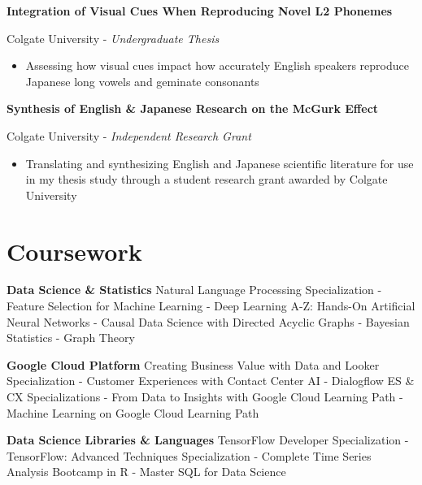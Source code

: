 \documentclass[a4paper,9pt]{extarticle}
\begin{document}
\noindent\textbf{Integration of Visual Cues When Reproducing Novel L2 Phonemes}

Colgate University - \textit{Undergraduate Thesis}
\begin{itemize}
\item Assessing how visual cues impact how accurately English speakers reproduce Japanese long vowels and geminate consonants
\end{itemize}

\noindent\textbf{Synthesis of English \& Japanese Research on the McGurk Effect}

Colgate University - \textit{Independent Research Grant}
\begin{itemize}
\item Translating and synthesizing English and Japanese scientific literature for use in my thesis study through a student research grant awarded by Colgate University
\end{itemize}

\section*{Coursework}
\noindent\textbf{Data Science \& Statistics}
Natural Language Processing Specialization - Feature Selection for Machine Learning - Deep Learning A-Z: Hands-On Artificial Neural Networks - Causal Data Science with Directed Acyclic Graphs - Bayesian Statistics - Graph Theory

\noindent\textbf{Google Cloud Platform}
Creating Business Value with Data and Looker Specialization - Customer Experiences with Contact Center AI - Dialogflow ES \& CX Specializations - From Data to Insights with Google Cloud Learning Path - Machine Learning on Google Cloud Learning Path

\noindent\textbf{Data Science Libraries \& Languages}
TensorFlow Developer Specialization - TensorFlow: Advanced Techniques Specialization - Complete Time Series Analysis Bootcamp in R - Master SQL for Data Science
\end{document}
